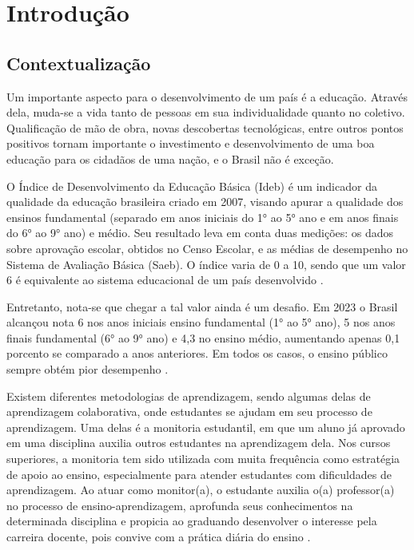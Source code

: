 \chapter[Introdução]{Introdução}
\label{cap:introducao}

\section[Contextualização]{Contextualização}
\label{sec:contextualizacao}

Um importante aspecto para o desenvolvimento de um país é a educação. Através dela, muda-se a vida tanto de pessoas em sua individualidade quanto no coletivo. Qualificação de mão de obra, novas descobertas tecnológicas, entre outros pontos positivos tornam importante o investimento e desenvolvimento de uma boa educação para os cidadãos de uma nação, e o Brasil não é exceção.

O Índice de Desenvolvimento da Educação Básica (Ideb) é um indicador da qualidade da educação brasileira criado em 2007, visando apurar a qualidade dos ensinos fundamental (separado em anos iniciais do 1° ao 5° ano e em anos finais do 6° ao 9° ano) e médio. Seu resultado leva em conta duas medições: os dados sobre aprovação escolar, obtidos no Censo Escolar, e as médias de desempenho no Sistema de Avaliação Básica (Saeb). O índice varia de 0 a 10, sendo que um valor 6 é equivalente ao sistema educacional de um país desenvolvido \cite{inep2024indicador}.

Entretanto, nota-se que chegar a tal valor ainda é um desafio. Em 2023 o Brasil alcançou nota 6 nos anos iniciais ensino fundamental (1° ao 5° ano), 5 nos anos finais fundamental (6° ao 9° ano) e 4,3 no ensino médio, aumentando apenas 0,1 porcento se comparado a anos anteriores. Em todos os casos, o ensino público sempre obtém pior desempenho \cite{ferreira2024educacao}. 

Existem diferentes metodologias de aprendizagem, sendo algumas delas de aprendizagem colaborativa, onde estudantes se ajudam em seu processo de aprendizagem. Uma delas é a monitoria estudantil, em que um aluno já aprovado em uma disciplina auxilia outros estudantes na aprendizagem dela. Nos cursos superiores, a monitoria tem sido utilizada com muita frequência como estratégia de apoio ao ensino, especialmente para atender estudantes com dificuldades de aprendizagem. Ao atuar como monitor(a), o estudante auxilia o(a) professor(a) no processo de ensino-aprendizagem, aprofunda seus conhecimentos na determinada disciplina e propicia ao graduando desenvolver o interesse pela carreira docente, pois convive com a prática diária do ensino \cite{gonccalves2021importancia}.

